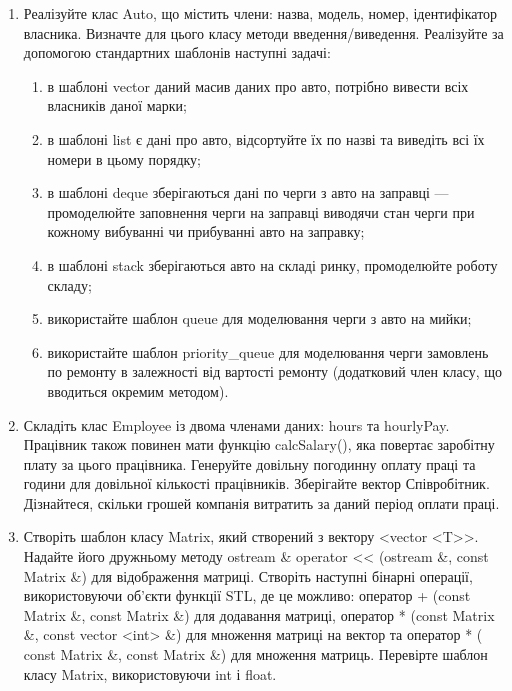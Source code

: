 \documentclass[a5paper,titlepage,openany,twoside,
]
{book_unv}%
\makeatletter
\newcommand{\xslalph}[1]{\expandafter\@xslalph\csname c@#1\endcsname}
\newcommand{\@xslalph}[1]{%
    \ifcase#1\or а\or б\or в\or г\or д\or e\or є\or ж\or з\or i%
    \or й\or к\or л\or м\or н\or о\or п\or р\or с\or т%
    \or у\or ф\or х\or ц\or ч\or ш\or ю\or я\or аа\or бб\or вв%
    \else\@ctrerr\fi%
}
\makeatother
\begin{document}
\begin{enumerate}
\begin{enumerate}
\begin{enumerate}
\item

Реалізуйте клас Auto, що містить члени: назва, модель, номер, ідентифікатор власника.
Визначте для цього класу методи введення/виведення.
Реалізуйте за допомогою стандартних шаблонів наступні задачі:
\begin{enumerate}[label=\xslalph*)]
\item
    в шаблоні vector даний масив даних про авто, потрібно вивести всіх власників даної марки;
\item
    в шаблоні list є дані про авто, відсортуйте їх по назві та виведіть всі їх номери в цьому порядку;
\item
    в шаблоні deque зберігаються дані по черги з авто на заправці --- промоделюйте заповнення черги
на заправці виводячи стан черги при кожному вибуванні чи прибуванні авто на заправку;
\item
    в шаблоні stack зберігаються авто на складі ринку, промоделюйте роботу складу;
\item
    використайте шаблон queue для моделювання черги з авто на мийки;
\item
    використайте шаблон priority\_queue для моделювання черги замовлень по ремонту в
залежності від вартості ремонту (додатковий член класу, що вводиться окремим методом).
\end{enumerate}    

\item
  Складіть клас Employee із двома членами даних: hours та hourlyPay.
  Працівник також повинен мати функцію calcSalary(), яка повертає
  заробітну плату за цього працівника. Генеруйте довільну погодинну
  оплату праці та години для довільної кількості працівників. Зберігайте
  вектор Співробітник. Дізнайтеся, скільки
  грошей компанія витратить за даний період оплати праці.


\item
  Створіть шаблон класу Matrix, який створений з вектору
  \textless{}vector \textless{}T\textgreater{}\textgreater{}. Надайте
  його дружньому методу ostream \& operator \textless{}\textless{}
  (ostream \&, const Matrix \&) для відображення матриці. Створіть
  наступні бінарні операції, використовуючи об'єкти функції STL, де це
  можливо: оператор + (const Matrix \&, const Matrix \&) для додавання
  матриці, оператор * (const Matrix \&, const vector
  \textless{}int\textgreater{} \&) для множення матриці на вектор та
  оператор * ( const Matrix \&, const Matrix \&) для множення матриць.
  Перевірте шаблон класу Matrix, використовуючи int і float.


\end{enumerate}
\end{enumerate}
\end{enumerate}
\end{document}
